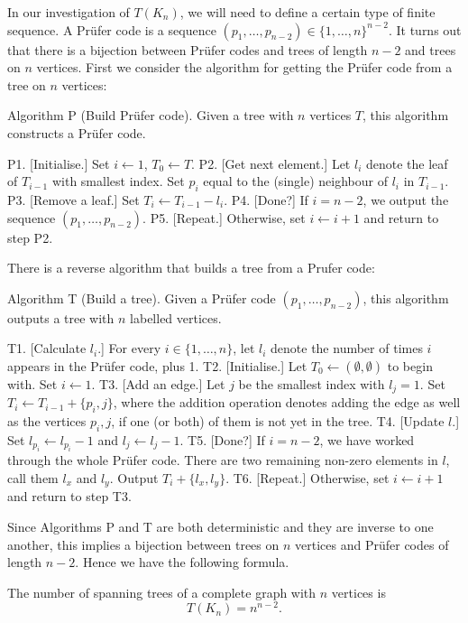 In our investigation of $T(K_n)$, we will need to define a certain type of finite sequence. A Pr{\"u}fer code is a sequence $(p_1, \ldots, p_{n-2})\in \{1,\ldots,n\}^{n-2}$. It turns out that there is a bijection between Pr{\"u}fer codes and trees of length $n-2$ and trees on $n$ vertices. First we consider the algorithm for getting the Pr{\"u}fer code from a tree on $n$ vertices:

\algbegin Algorithm P (Build Pr{\"u}fer code). Given a tree with $n$ vertices $T$, this algorithm constructs a Pr{\"u}fer code.

\algstep P1. [Initialise.] Set $i\gets 1$, $T_0\gets T$.
\algstep P2. [Get next element.] Let $l_i$ denote the leaf of $T_{i-1}$ with smallest index. Set $p_i$ equal to the (single) neighbour of $l_i$ in $T_{i-1}$.
\algstep P3. [Remove a leaf.] Set $T_i\gets T_{i-1}-l_i$.
\algstep P4. [Done?] If $i=n-2$, we output the sequence $(p_1,\ldots, p_{n-2})$. 
\algstep P5. [Repeat.] Otherwise, set $i\gets i+1$ and return to step P2. \slug

There is a reverse algorithm that builds a tree from a Prufer code:

\algbegin Algorithm T (Build a tree). Given a Pr{\"u}fer code $(p_1,\ldots, p_{n-2})$, this algorithm outputs a tree with $n$ labelled vertices.

\algstep T1. [Calculate $l_i$.] For every $i\in \{1, \ldots, n\}$, let $l_i$ denote the number of times $i$ appears in the Pr{\"u}fer code, plus 1.
\algstep T2. [Initialise.] Let $T_0 \gets(\emptyset, \emptyset)$ to begin with. Set $i\gets 1$.
\algstep T3. [Add an edge.] Let $j$ be the smallest index with $l_j = 1$. Set $T_i \gets T_{i-1} + \{p_i, j\}$, where the addition operation denotes adding the edge as well as the vertices $p_i, j$, if one (or both) of them is not yet in the tree.
\algstep T4. [Update $l$.] Set $l_{p_i} \gets l_{p_i} - 1$ and $l_j \gets l_j - 1$.
\algstep T5. [Done?] If $i = n-2$, we have worked through the whole Pr{\"u}fer code. There are two remaining non-zero elements in $l$, call them $l_x$ and $l_y$. Output $T_i + \{l_x, l_y\}$.
\algstep T6. [Repeat.] Otherwise, set $i\gets i+1$ and return to step T3. \slug

Since Algorithms P and T are both deterministic and they are inverse to one another, this implies a bijection between trees on $n$ vertices and Pr{\"u}fer codes of length $n-2$. Hence we have the following formula.

 The number of spanning trees of a complete graph with $n$ vertices is
$$ T(K_n) = n^{n-2}.$$

